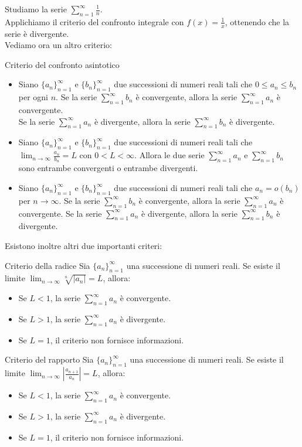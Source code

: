 Studiamo la serie $\sum_{n=1}^{\infty} \frac{1}{n}$.\\
Applichiamo il criterio del confronto integrale con $f(x) = \frac{1}{x}$, ottenendo che la serie è divergente.\\

Vediamo ora un altro criterio:
\begin{teorema}{Criterio del confronto asintotico}
  \begin{itemize}
  \item  Siano $\{a_n\}_{n=1}^{\infty}$ e $\{b_n\}_{n=1}^{\infty}$ due successioni di numeri reali tali che $0 \leq a_n \leq b_n$ per ogni $n$. Se la serie $\sum_{n=1}^{\infty} b_n$ è convergente, allora la serie $\sum_{n=1}^{\infty} a_n$ è convergente.\\
  Se la serie $\sum_{n=1}^{\infty} a_n$ è divergente, allora la serie $\sum_{n=1}^{\infty} b_n$ è divergente.
  \item Siano $\{a_n\}_{n=1}^{\infty}$ e $\{b_n\}_{n=1}^{\infty}$ due successioni di numeri reali tali che $\lim_{n \to \infty} \frac{a_n}{b_n} = L$ con $0 < L < \infty$. Allora le due serie $\sum_{n=1}^{\infty} a_n$ e $\sum_{n=1}^{\infty} b_n$ sono entrambe convergenti o entrambe divergenti.
  \item Siano $\{a_n\}_{n=1}^{\infty}$ e $\{b_n\}_{n=1}^{\infty}$ due successioni di numeri reali tali che $a_n = o(b_n)$ per $n \to \infty$. Se la serie $\sum_{n=1}^{\infty} b_n$ è convergente, allora la serie $\sum_{n=1}^{\infty} a_n$ è convergente. Se la serie $\sum_{n=1}^{\infty} a_n$ è divergente, allora la serie $\sum_{n=1}^{\infty} b_n$ è divergente.
  \end{itemize}
\end{teorema}

Esistono inoltre altri due importanti criteri:
\begin{teorema}{Criterio della radice}
  Sia $\{a_n\}_{n=1}^{\infty}$ una successione di numeri reali. Se esiste il limite $\lim_{n \to \infty} \sqrt[n]{|a_n|} = L$, allora:
  \begin{itemize}
    \item Se $L < 1$, la serie $\sum_{n=1}^{\infty} a_n$ è convergente.
    \item Se $L > 1$, la serie $\sum_{n=1}^{\infty} a_n$ è divergente.
    \item Se $L = 1$, il criterio non fornisce informazioni.
  \end{itemize}
\end{teorema}
\begin{teorema}{Criterio del rapporto}
  Sia $\{a_n\}_{n=1}^{\infty}$ una successione di numeri reali. Se esiste il limite $\lim_{n \to \infty} \left| \frac{a_{n+1}}{a_n} \right| = L$, allora:
  \begin{itemize}
    \item Se $L < 1$, la serie $\sum_{n=1}^{\infty} a_n$ è convergente.
    \item Se $L > 1$, la serie $\sum_{n=1}^{\infty} a_n$ è divergente.
    \item Se $L = 1$, il criterio non fornisce informazioni.
  \end{itemize}
\end{teorema}

